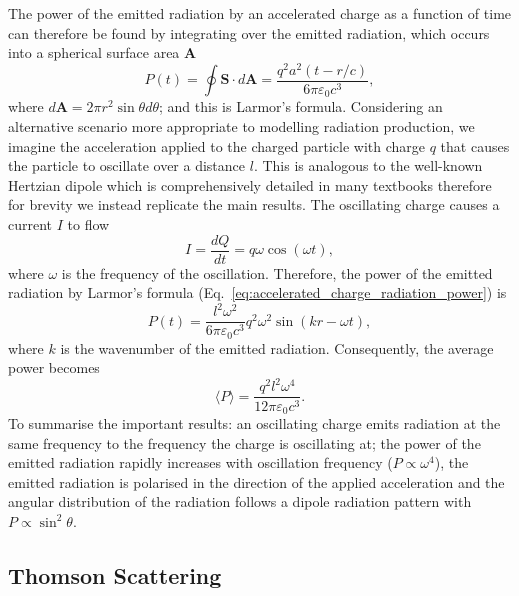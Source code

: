 \documentclass[../main.tex]{subfiles}
\begin{document}
The power of the emitted radiation by an accelerated charge as a function of time can therefore be found by integrating over the emitted radiation, which occurs into a spherical surface area $\boldsymbol{A}$
\begin{equation}
P\left(t\right) = \oint\boldsymbol{S}\cdot d\boldsymbol{A} = \frac{q^{2}a^{2}\left(t-r/c\right)}{6\pi\varepsilon_{0}c^{3}},
\label{eq:accelerated_charge_radiation_power}    
\end{equation}
where $d\boldsymbol{A} = 2\pi r^{2}\sin\theta d\theta$; and this is Larmor's formula. Considering an alternative scenario more appropriate to modelling radiation production, we imagine the acceleration applied to the charged particle with charge $q$ that causes the particle to oscillate over a distance $l$. This is analogous to the well-known Hertzian dipole which is comprehensively detailed in many textbooks \cite{purcell1965electricity,appleby2020science} therefore for brevity we instead replicate the main results. The oscillating charge causes a current $I$ to flow
\begin{equation}
I = \frac{dQ}{dt} = q\omega\cos\left(\omega t\right),    
\end{equation}
where $\omega$ is the frequency of the oscillation. Therefore, the power of the emitted radiation by Larmor's formula (Eq.~\ref{eq:accelerated_charge_radiation_power}) is
\begin{equation}
P\left(t\right) = \frac{l^{2}\omega^{2}}{6\pi\varepsilon_{0}c^{3}}q^{2}\omega^{2}\sin\left(kr-\omega t\right),
\label{eq:dipole_radiation_power}    
\end{equation}
where $k$ is the wavenumber of the emitted radiation. Consequently, the average power becomes
\begin{equation}
\langle P\rangle = \frac{q^{2}l^{2}\omega^{4}}{12\pi\varepsilon_{0}c^{3}}.   
\end{equation}
To summarise the important results: an oscillating charge emits radiation at the same frequency to the frequency the charge is oscillating at; the power of the emitted radiation rapidly increases with oscillation frequency ($P \propto \omega^{4}$), the emitted radiation is polarised in the direction of the applied acceleration and the angular distribution of the radiation follows a dipole radiation pattern with $P \propto \sin^{2}\theta$. 

\subsection{Thomson Scattering}
\end{document}
